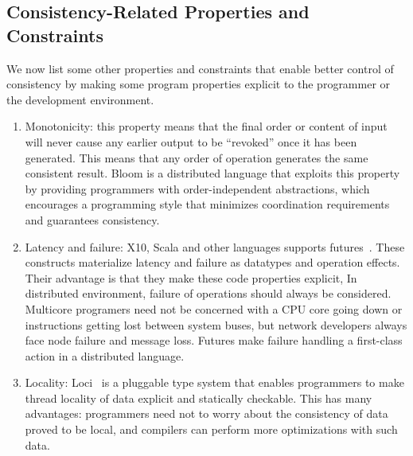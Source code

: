 \documentclass[]{usiinfprospectus}
\begin{document}
\subsection{Consistency-Related Properties and Constraints}
We now list some other properties and constraints that enable better control of consistency by making some program properties explicit to the programmer or the development environment. 
\begin{enumerate}
	\itemsep0em
\item Monotonicity: this property means that the final order or content of input will never cause any earlier output to be ``revoked'' once it has been generated. This means that any order of operation generates the same consistent result. Bloom is a distributed language that exploits this property by providing programmers with order-independent abstractions, which encourages a programming style that minimizes coordination requirements and guarantees consistency.~\cite{alvaro2011consistency}

\item Latency and failure: X10, Scala and other languages supports futures~\cite{hallerfutures}. These constructs materialize latency and failure as datatypes and operation effects. Their advantage is that they make these code properties explicit, In distributed environment, failure of operations should always be considered. Multicore programers need not be concerned with a CPU core going down or instructions getting lost between system buses, but network developers always face node failure and message loss. Futures make failure handling a first-class action in a distributed language.

\item Locality: Loci~\cite{wrigstad2009loci} is a pluggable type system that enables programmers to make thread locality of data explicit and statically checkable. This has many advantages: programmers need not to worry about the consistency of data proved to be local, and compilers can perform more optimizations with such data. 


\end{enumerate}
\end{document}
